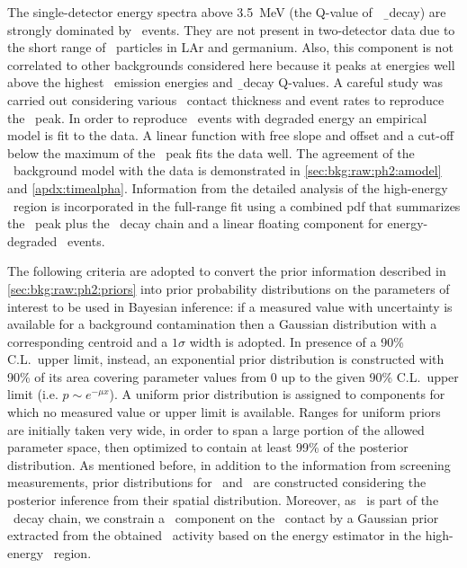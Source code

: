 The single-detector energy spectra above 3.5~MeV (the Q-value of \kvz\ \b\ decay) are
strongly dominated by \a\ events. They are not present in two-detector data due to the
short range of \a\ particles in LAr and germanium. Also, this component is not correlated
to other backgrounds considered here because it peaks at energies well above the highest
\g\ emission energies and \b\ decay Q-values. A careful study was carried out considering
various \pplus\ contact thickness and event rates to reproduce the \Po\ peak. In order to
reproduce \a\ events with degraded energy an empirical model is fit to the data. A linear
function with free slope and offset and a cut-off below the maximum of the \Po\ peak fits
the data well. The agreement of the \a\ background model with the data is demonstrated in
\cref{sec:bkg:raw:ph2:amodel} and \cref{apdx:timealpha}. Information from the detailed
analysis of the high-energy \a\ region is incorporated in the full-range fit using a
combined pdf that summarizes the \Po\ peak plus the \Ra\ decay chain and a linear floating
component for energy-degraded \a\ events.

The following criteria are adopted to convert the prior information described in
\cref{sec:bkg:raw:ph2:priors} into prior probability distributions on the parameters of
interest to be used in Bayesian inference: if a measured value with uncertainty is
available for a background contamination then a Gaussian distribution with a corresponding
centroid and a $1\sigma$ width is adopted. In presence of a 90\% C.L.~upper limit,
instead, an exponential prior distribution is constructed with 90\% of its area covering
parameter values from 0 up to the given 90\% C.L.~upper limit (i.e. $p \sim e^{-\mu x}$).
A uniform prior distribution is assigned to components for which no measured value or
upper limit is available. Ranges for uniform priors are initially taken very wide, in
order to span a large portion of the allowed parameter space, then optimized to contain at
least 99\% of the posterior distribution. As mentioned before, in addition to the
information from screening measurements, prior distributions for \kvn\ and \kvz\ are
constructed considering the posterior inference from their spatial distribution. Moreover,
as \Bih\ is part of the \Ra\ decay chain, we constrain a \Bih\ component on the \pplus\
contact by a Gaussian prior extracted from the obtained \Ra{}ctivity based on the energy
estimator in the high-energy \a\ region.

